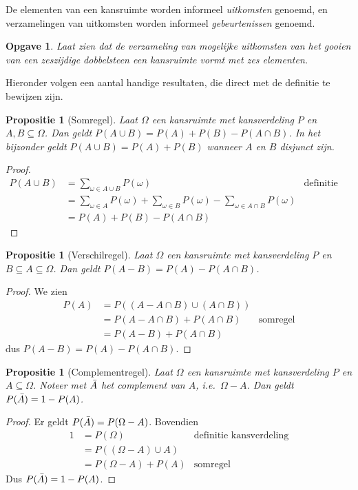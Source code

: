 \documentclass[a4paper]{book}
\newtheorem{proposition}[theorem]{Propositie}
\newtheorem{exercise}[theorem]{Opgave}
\theoremstyle{definition}
\begin{document}
De elementen van een kansruimte worden informeel \emph{uitkomsten} genoemd, en verzamelingen van uitkomsten worden informeel \emph{gebeurtenissen}
genoemd.

\begin{exercise}
    Laat zien dat de verzameling van mogelijke uitkomsten van het gooien van een zeszijdige dobbelsteen een kansruimte vormt met zes elementen.
\end{exercise}

Hieronder volgen een aantal handige resultaten, die direct met de definitie te bewijzen zijn.
\begin{proposition}[Somregel]\label{somregel}
    Laat $\Omega$ een kansruimte met kansverdeling $P$ en $A,B \subseteq \Omega$.
    Dan geldt $P(A \cup B) = P(A) + P(B) - P(A \cap B)$.
    In het bijzonder geldt $P(A \cup B) = P(A) + P(B)$ wanneer $A$ en $B$ disjunct zijn.
\end{proposition}
\begin{proof}
    \begin{align*}
        P(A \cup B)     &= \sum_{\omega \in A \cup B} P(\omega) & \text{definitie kansverdeling}\\
                        &= \sum_{\omega \in A} P(\omega) + \sum_{\omega \in B} P(\omega) - \sum_{\omega \in A \cap B} P(\omega) \\
                        &= P(A) + P(B) - P(A \cap B)
    \end{align*}
\end{proof}

\begin{proposition}[Verschilregel]\label{verschilregel}
    Laat $\Omega$ een kansruimte met kansverdeling $P$ en $B \subseteq A \subseteq \Omega$.
    Dan geldt $P(A - B) = P(A) - P(A \cap B) $.
\end{proposition}
\begin{proof}
    We zien
    \begin{align*}
        P(A)    &= P( (A - A \cap B) \cup (A \cap B) ) \\
                &= P(A - A \cap B ) + P(A \cap B) & \text{somregel} \\
                &= P(A - B) + P(A \cap B)
    \end{align*}
    dus $P(A - B) = P(A) - P(A \cap B) $.
\end{proof}

\begin{proposition}[Complementregel]\label{complementregel}
    Laat $\Omega$ een kansruimte met kansverdeling $P$ en $A \subseteq \Omega$.
    Noteer met $\compl{A}$ het complement van $A$, i.e.\ $\Omega - A$.
    Dan geldt $P(\compl{A}) = 1 - P(A)$.
\end{proposition}
\begin{proof}
    Er geldt $P(\compl{A}) = P(\Omega - A)$.
    Bovendien
    \begin{align*}
        1 &= P(\Omega) & \text{definitie kansverdeling}\\
          &= P( (\Omega - A) \cup A) \\
          &= P(\Omega - A) + P(A) & \text{somregel}
    \end{align*}
    Dus $P(\compl{A}) = 1 - P(A)$.
\end{proof}
\end{document}
